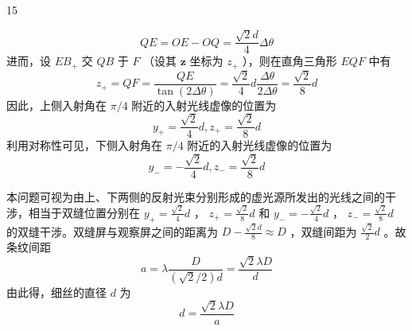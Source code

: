 \begin{solution}{15}
\begin{subsolution}
\begin{equation}
Q E = O E - O Q = \frac {\sqrt {2} d}{4} \Delta \theta
\label{eq:6.s15}
\end{equation}
进而，设 $EB_{+}$ 交 $QB$ 于 $F$ （设其 $\mathbf{z}$ 坐标为 $z_{+}$ ），则在直角三角形 $EQF$ 中有
\begin{equation}
z _ {+} = Q F = \frac {Q E}{\tan (2 \Delta \theta)} = \frac {\sqrt {2}}{4} d \frac {\Delta \theta}{2 \Delta \theta} = \frac {\sqrt {2}}{8} d
\label{eq:7.s15}
\end{equation}
因此，上侧入射角在 $\pi /4$ 附近的入射光线虚像的位置为
\begin{equation}
y _ {+} = \frac {\sqrt {2}}{4} d, z _ {+} = \frac {\sqrt {2}}{8} d
\label{eq:8.s15}
\end{equation}
利用对称性可见，下侧入射角在 $\pi /4$ 附近的入射光线虚像的位置为
\begin{equation}
y _ {-} = - \frac {\sqrt {2}}{4} d, z _ {-} = \frac {\sqrt {2}}{8} d
\label{eq:9.s15}
\end{equation}
\end{subsolution}

\begin{subsolution}
本问题可视为由上、下两侧的反射光束分别形成的虚光源所发出的光线之间的干涉，相当于双缝位置分别在 $y_{+} = \frac{\sqrt{2}}{4} d$ ， $z_{+} = \frac{\sqrt{2}}{8} d$ 和 $y_{-} = -\frac{\sqrt{2}}{4} d$ ， $z_{-} = \frac{\sqrt{2}}{8} d$ 的双缝干涉。双缝屏与观察屏之间的距离为 $D - \frac{\sqrt{2}d}{8} \approx D$ ，双缝间距为 $\frac{\sqrt{2}}{2} d$ 。故条纹间距
\begin{equation}
a = \lambda \frac {D}{(\sqrt {2} / 2) d} = \frac {\sqrt {2} \lambda D}{d}
\label{eq:10.s15}
\end{equation}
由此得，细丝的直径 $d$ 为
\begin{equation}
d = \frac {\sqrt {2} \lambda D}{a}
\label{eq:11.s15}
\end{equation}
\end{subsolution}
\end{solution}